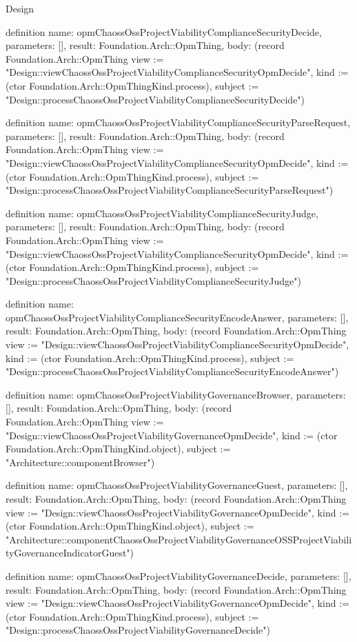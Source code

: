 \begin{lexlean}{Design}
\begin{semanticmodule}
definition{
  name: opmChaossOssProjectViabilityComplianceSecurityDecide,
  parameters: [],
  result: Foundation.Arch::OpmThing,
  body: (record Foundation.Arch::OpmThing {view := "Design::viewChaossOssProjectViabilityComplianceSecurityOpmDecide", kind := (ctor Foundation.Arch::OpmThingKind.process), subject := "Design::processChaossOssProjectViabilityComplianceSecurityDecide"})
}

definition{
  name: opmChaossOssProjectViabilityComplianceSecurityParseRequest,
  parameters: [],
  result: Foundation.Arch::OpmThing,
  body: (record Foundation.Arch::OpmThing {view := "Design::viewChaossOssProjectViabilityComplianceSecurityOpmDecide", kind := (ctor Foundation.Arch::OpmThingKind.process), subject := "Design::processChaossOssProjectViabilityComplianceSecurityParseRequest"})
}

definition{
  name: opmChaossOssProjectViabilityComplianceSecurityJudge,
  parameters: [],
  result: Foundation.Arch::OpmThing,
  body: (record Foundation.Arch::OpmThing {view := "Design::viewChaossOssProjectViabilityComplianceSecurityOpmDecide", kind := (ctor Foundation.Arch::OpmThingKind.process), subject := "Design::processChaossOssProjectViabilityComplianceSecurityJudge"})
}

definition{
  name: opmChaossOssProjectViabilityComplianceSecurityEncodeAnswer,
  parameters: [],
  result: Foundation.Arch::OpmThing,
  body: (record Foundation.Arch::OpmThing {view := "Design::viewChaossOssProjectViabilityComplianceSecurityOpmDecide", kind := (ctor Foundation.Arch::OpmThingKind.process), subject := "Design::processChaossOssProjectViabilityComplianceSecurityEncodeAnswer"})
}

definition{
  name: opmChaossOssProjectViabilityGovernanceBrowser,
  parameters: [],
  result: Foundation.Arch::OpmThing,
  body: (record Foundation.Arch::OpmThing {view := "Design::viewChaossOssProjectViabilityGovernanceOpmDecide", kind := (ctor Foundation.Arch::OpmThingKind.object), subject := "Architecture::componentBrowser"})
}

definition{
  name: opmChaossOssProjectViabilityGovernanceGuest,
  parameters: [],
  result: Foundation.Arch::OpmThing,
  body: (record Foundation.Arch::OpmThing {view := "Design::viewChaossOssProjectViabilityGovernanceOpmDecide", kind := (ctor Foundation.Arch::OpmThingKind.object), subject := "Architecture::componentChaossOssProjectViabilityGovernanceOSSProjectViabilityGovernanceIndicatorGuest"})
}

definition{
  name: opmChaossOssProjectViabilityGovernanceDecide,
  parameters: [],
  result: Foundation.Arch::OpmThing,
  body: (record Foundation.Arch::OpmThing {view := "Design::viewChaossOssProjectViabilityGovernanceOpmDecide", kind := (ctor Foundation.Arch::OpmThingKind.process), subject := "Design::processChaossOssProjectViabilityGovernanceDecide"})
}


\end{semanticmodule}
\end{lexlean}
